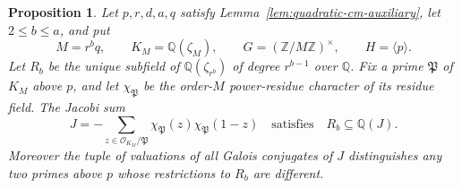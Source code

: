 \documentclass[11pt]{article}
\newtheorem{proposition}[theorem]{Proposition}
\theoremstyle{definition}
\theoremstyle{remark}
\begin{document}
\begin{proposition}\label{prop:jacobi-wild-subfield}
Let \(p,r,d,a,q\) satisfy Lemma~\ref{lem:quadratic-cm-auxiliary},
let \(2\leq b\leq a\), and put
\[
 M=r^bq,\qquad K_M=\mathbb Q(\zeta_M),\qquad
 G=(\mathbb Z/M\mathbb Z)^\times,\qquad H=\langle p\rangle.
\]
Let \(R_b\) be the unique subfield of \(\mathbb Q(\zeta_{r^b})\)
of degree \(r^{b-1}\) over \(\mathbb Q\).
Fix a prime \(\mathfrak P\) of \(K_M\) above \(p\), and let
\(\chi_{\mathfrak P}\) be the order-\(M\) power-residue character
of its residue field. The Jacobi sum
\[
 J=-\sum_{z\in\mathcal O_{K_M}/\mathfrak P}
       \chi_{\mathfrak P}(z)\chi_{\mathfrak P}(1-z)
 \quad\text{satisfies}\quad
 R_b\subseteq\mathbb Q(J).
\]
Moreover the tuple of valuations of all Galois conjugates of \(J\) distinguishes
any two primes above \(p\) whose restrictions to \(R_b\) are
different.
\end{proposition}
\end{document}
